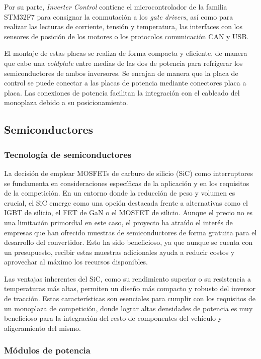 Por su parte, \textit{Inverter Control} contiene el microcontrolador de la familia STM32F7 para consignar la conmutación a los \textit{gate drivers}, así como para realizar las lecturas de corriente, tensión y temperatura, las interfaces con los sensores de posición de los motores o los protocolos comunicación CAN y USB.

El montaje de estas placas se realiza de forma compacta y eficiente, de manera que cabe una \textit{coldplate} entre medias de las dos de potencia para refrigerar los semiconductores de ambos inversores. Se encajan de manera que la placa de control se puede conectar a las placas de potencia mediante conectores placa a placa. Las conexiones de potencia facilitan la integración con el cableado del monoplaza debido a su posicionamiento.


\subsection{Semiconductores}

\subsubsection{Tecnología de semiconductores}

La decisión de emplear MOSFETs de carburo de silicio (SiC) como interruptores se fundamenta en consideraciones específicas de la aplicación y en los requisitos de la competición. En un entorno donde la reducción de peso y volumen es crucial, el SiC emerge como una opción destacada frente a alternativas como el IGBT de silicio, el FET de GaN o el MOSFET de silicio. Aunque el precio no es una limitación primordial en este caso, el proyecto ha atraído el interés de empresas que han ofrecido muestras de semiconductores de forma gratuita para el desarrollo del convertidor. Esto ha sido beneficioso, ya que aunque se cuenta con un presupuesto, recibir estas muestras adicionales ayuda a reducir costos y aprovechar al máximo los recursos disponibles.

Las ventajas inherentes del SiC, como su rendimiento superior o su resistencia a temperaturas más altas, permiten un diseño más compacto y robusto del inversor de tracción. Estas características son esenciales para cumplir con los requisitos de un monoplaza de competición, donde lograr altas densidades de potencia es muy beneficioso para la integración del resto de componentes del vehículo y aligeramiento del mismo.

\subsubsection{Módulos de potencia}

